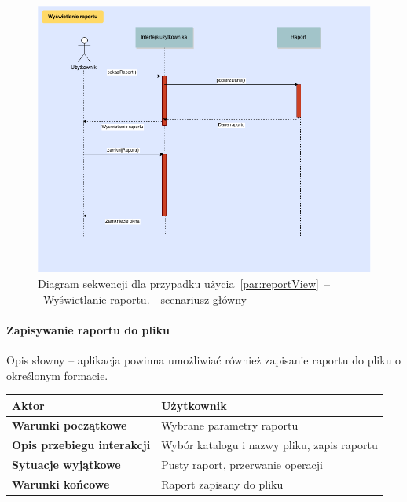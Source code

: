 \begin{figure}[H]
    \includegraphics[width=\textwidth,
    height=0.5\textheight]{images/raport_show.png}
    \caption{Diagram sekwencji dla przypadku użycia~\ref{par:reportView}~--~Wyświetlanie raportu.
    - scenariusz główny}
\end{figure}

\paragraph{Zapisywanie raportu do pliku\newline}
\label{par:reportExport}

Opis słowny -- aplikacja powinna umożliwiać również zapisanie raportu do pliku o określonym formacie.

\begin{longtable}{|p{5cm}|p{7cm}|}
 	\hline
	\textbf{Aktor} & Użytkownik \\
	\hline
	\textbf{Warunki początkowe} & Wybrane parametry raportu \\
	\hline
	\textbf{Opis przebiegu interakcji} & Wybór katalogu i nazwy pliku, zapis raportu \\
	\hline
	\textbf{Sytuacje wyjątkowe} & Pusty raport, przerwanie operacji \\
	\hline
	\textbf{Warunki końcowe} & Raport zapisany do pliku \\
	\hline
\end{longtable}


